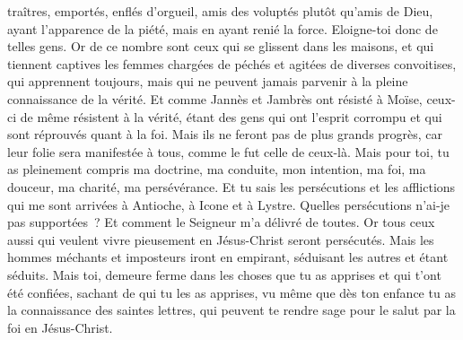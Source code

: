 \begin{multicols}{2}
traîtres, emportés, enflés d'orgueil, amis des voluptés plutôt qu'amis de Dieu,
ayant l'apparence de la piété, mais en ayant renié la force. Eloigne-toi donc de telles gens.
Or de ce nombre sont ceux qui se glissent dans les maisons, et qui tiennent captives les femmes chargées de péchés et agitées de diverses convoitises,
qui apprennent toujours, mais qui ne peuvent jamais parvenir à la pleine connaissance de la vérité.
Et comme Jannès et Jambrès ont résisté à Moïse, ceux-ci de même résistent à la vérité, étant des gens qui ont l'esprit corrompu et qui sont réprouvés quant à la foi.
Mais ils ne feront pas de plus grands progrès, car leur folie sera manifestée à tous, comme le fut celle de ceux-là.
Mais pour toi, tu as pleinement compris ma doctrine, ma conduite, mon intention, ma foi, ma douceur, ma charité, ma persévérance.
Et tu sais les persécutions et les afflictions qui me sont arrivées à Antioche, à Icone et à Lystre. Quelles persécutions n'ai-je pas supportées~? Et comment le Seigneur m'a délivré de toutes.
Or tous ceux aussi qui veulent vivre pieusement en Jésus-Christ seront persécutés.
Mais les hommes méchants et imposteurs iront en empirant, séduisant les autres et étant séduits.
Mais toi, demeure ferme dans les choses que tu as apprises et qui t'ont été confiées, sachant de qui tu les as apprises,
vu même que dès ton enfance tu as la connaissance des saintes lettres, qui peuvent te rendre sage pour le salut par la foi en Jésus-Christ.

\end{multicols}
